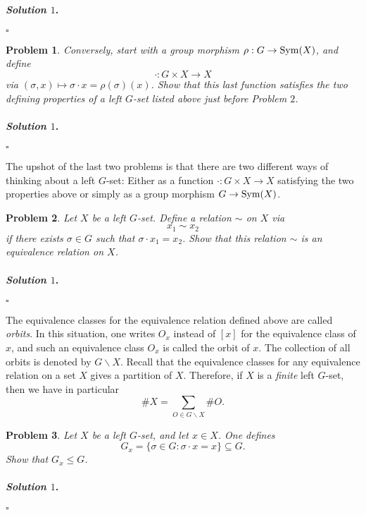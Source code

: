 \documentclass[reqno]{amsart}
\theoremstyle{plain}
\newtheorem{problem}{Problem}
\theoremstyle{definition}
\newenvironment{solution1}{\paragraph{\emph{Solution $1$}.}}{\hfill$\square$}
\begin{document}
\begin{solution1}

\end{solution1}



\begin{problem}
Conversely, start with a group morphism $\rho:G \rightarrow {\rm Sym}(X)$, and define 
$$\cdot : G \times X \rightarrow X $$
via $(\sigma,x) \mapsto \sigma \cdot x = \rho(\sigma)(x)$.  Show that this last function satisfies the two defining properties of a left $G$-set listed above just before Problem $2$.
\end{problem}
\begin{solution1}

\end{solution1}

The upshot of the last two problems is that there are two different ways of thinking about a left $G$-set:  Either as a function $\cdot:G\times X \rightarrow X$ satisfying the two properties above or simply as a group morphism $G \rightarrow {\rm Sym}(X)$.  

\begin{problem}
Let $X$ be a left $G$-set.  Define a relation $\sim$ on $X$ via
$$x_{1} \sim x_{2} $$
if there exists $\sigma \in G$ such that $\sigma \cdot x_{1} = x_{2}$.  Show that this relation $\sim$ is an equivalence relation on $X$.
\end{problem}
\begin{solution1}

\end{solution1}

The equivalence classes for the equivalence relation defined above are called \emph{orbits}.  In this situation, one writes $O_{x}$ instead of $[x]$ for the equivalence class of $x$, and such an equivalence class $O_{x}$ is called the orbit of $x$.  The collection of all orbits is denoted by $G \backslash X$.  Recall that the equivalence classes for any equivalence relation on a set $X$ gives a partition of $X$.  Therefore, if $X$ is a \emph{finite} left $G$-set, then we have in particular
\begin{equation} \label{card_X}
\# X = \sum_{O \in G \backslash X}\#O.
\end{equation}


\begin{problem}
Let $X$ be a left $G$-set, and let $x \in X$.  One defines
$$G_{x} = \{ \sigma \in G : \sigma \cdot x = x\} \subseteq G. $$
Show that $G_{x} \le G$.
\end{problem}
\begin{solution1}

\end{solution1}
\end{document}
